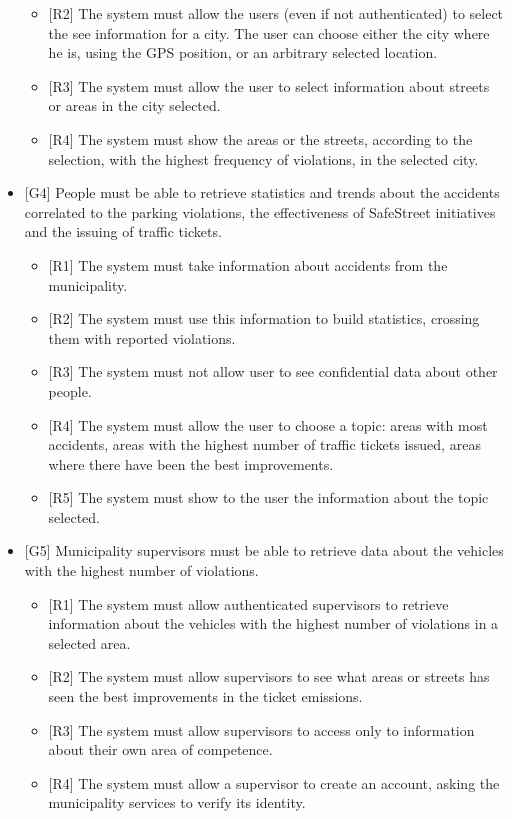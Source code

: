 \documentclass[a4paper]{report}
\begin{document}
\begin{itemize}
\begin{itemize}
\item {[R2]}	The system must allow the users (even if not authenticated) to select the see information for a city. The user can choose either the city where he is, using the GPS position, or an arbitrary selected location.
\item {[R3]}	The system must allow the user to select information about streets or areas in the city selected.
\item {[R4]}	The system must show the areas or the streets, according to the selection, with the highest frequency of violations, in the selected city.
\end{itemize}
\item  {[G4]} People must be able to retrieve statistics and trends about the accidents correlated to the parking violations, the 		effectiveness of SafeStreet initiatives and the issuing of traffic tickets.
\begin{itemize}
\item {[R1]}	The system must take information about accidents from the municipality.
\item {[R2]}	The system must use this information to build statistics, crossing them with reported violations.
\item {[R3]}	The system must not allow user to see confidential data about other people.
\item {[R4]}	The system must allow the user to choose a topic: areas with most accidents, areas with the highest number of traffic tickets issued, areas where there have been the best improvements.
\item {[R5]}	The system must show to the user the information about the topic selected.
\end{itemize}
\item  {[G5]} Municipality supervisors must be able to retrieve data about the vehicles with the highest number of violations.
\begin{itemize}
\item {[R1]}	The system must allow authenticated supervisors to retrieve information about the vehicles with the highest number of violations in a selected area.
\item {[R2]}	The system must allow supervisors to see what areas or streets has seen the best improvements in the ticket emissions.
\item {[R3]}	The system must allow supervisors to access only to information about their own area of competence.
\item {[R4]}	The system must allow a supervisor to create an account, asking the municipality services to verify its identity.

\end{itemize}
\end{itemize}
\end{document}
